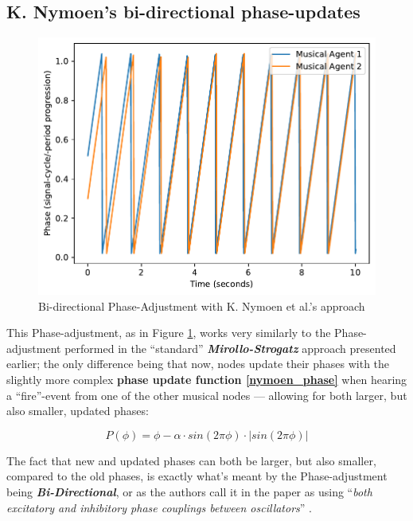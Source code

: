 	\subsection{K. Nymoen's bi-directional phase-updates} %
	
	\begin{figure}[h]
		\centering
		\includegraphics[width=0.9\linewidth]{Assets/Figures/NymoenPhaseAdjustment.pdf}
		\caption{Bi-directional Phase-Adjustment with K. Nymoen et al.'s approach}
		\label{fig:nymoen_phase}
	\end{figure}
	
	This Phase-adjustment, as in Figure \ref{fig:nymoen_phase}, works very similarly to the Phase-adjustment performed in the ``standard'' \textbf{\textit{Mirollo-Strogatz}} approach presented earlier; the only difference being that now, nodes update their phases with the slightly more complex \textbf{phase update function \eqref{nymoen_phase}} when hearing a ``fire''-event from one of the other musical nodes — allowing for both larger, but also smaller, updated phases:
	
	\begin{equation}
	\label{nymoen_phase}
		P(\phi) = \phi - \alpha \cdot sin(2\pi\phi) \cdot | sin(2\pi\phi) |
	\end{equation}
	
	The fact that new and updated phases can both be larger, but also smaller, compared to the old phases, is exactly what's meant by the Phase-adjustment being \textbf{\textit{Bi-Directional}}, or as the authors call it in the paper as using ``\textit{both excitatory and inhibitory phase couplings between oscillators}'' \cite{nymoen_synch}.
	
